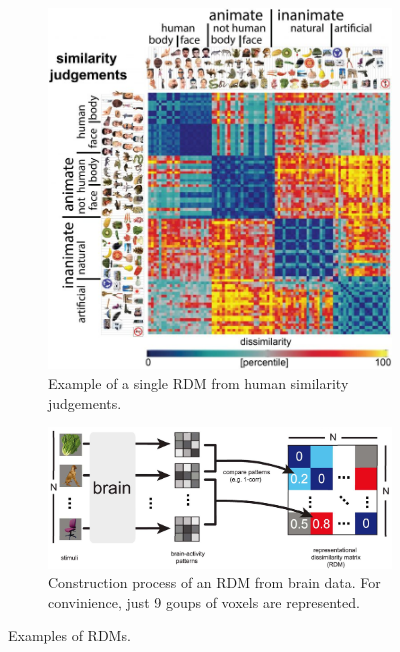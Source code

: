 \begin{figure}[!ht]
    \centering
    \captionsetup{width=.8\linewidth}
    \begin{subfigure}{.43\textwidth}
        \centering
        \captionsetup{width=.8\linewidth}
        \includegraphics[width=.6\linewidth]{images/rdm.jpg}
        \caption{Example of a single RDM from human similarity judgements.}
        \label{fig:rdm}
    \end{subfigure}
    \begin{subfigure}{.54\textwidth}
        \centering
        \captionsetup{width=.8\linewidth}
        \includegraphics[width=\linewidth]{images/rdm_brain.png}
        \caption{Construction process of an RDM from brain data. For convinience, just 9 goups of voxels are represented.}
        \label{fig:rdm_brain}
    \end{subfigure}
    \caption{Examples of RDMs.}
    \label{fig:rdms}
\end{figure}

